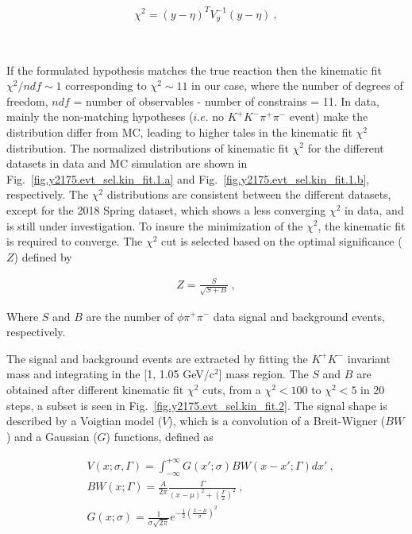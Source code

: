 \begin{equation}
    \label{eq.y2175.evt_sel.kin_fit.1}
    \begin{aligned}
        \chi^{2} = (y-\eta)^{T}V_{y}^{-1}(y-\eta)~,
    \end{aligned}
\end{equation}

~\par If the formulated hypothesis matches the true reaction then the kinematic fit $\chi^{2}/ndf \sim 1$ corresponding to $\chi^{2} \sim 11$ in our case, where the number of degrees of freedom, $ndf$ = number of observables - number of constrains = 11. In data, mainly the non-matching hypotheses ($i.e.$ no $K^{+}K^{-}\pi^{+}\pi^{-}$ event) make the distribution differ from MC, leading to higher tales in the kinematic fit $\chi^{2}$ distribution. The normalized distributions of kinematic fit $\chi^{2}$ for the different datasets in data and MC simulation are shown in Fig.~\ref{fig.y2175.evt_sel.kin_fit.1.a} and Fig.~\ref{fig.y2175.evt_sel.kin_fit.1.b}, respectively. The $\chi^{2}$ distributions are consistent between the different datasets, except for the 2018 Spring dataset, which shows a less converging $\chi^{2}$ in data, and is still under investigation. To insure the minimization of the $\chi^{2}$, the kinematic fit is required to converge. The $\chi^{2}$ cut is selected based on the optimal significance ($Z$) defined by

\begin{equation}
    \label{eq.y2175.evt_sel.kin_fit.2}
    \begin{aligned}
        Z = \frac{S}{\sqrt{S+B}}~,
    \end{aligned}
\end{equation}

Where $S$ and $B$ are the number of $\phi \pi^{+}\pi^{-}$ data signal and background events, respectively.
~\par The signal and background events are extracted by fitting the $K^+K^-$ invariant mass and integrating in the [1, 1.05 GeV/c$^2$] mass region. The $S$ and $B$ are obtained after different kinematic fit $\chi^2$ cuts, from a $\chi^2<100$ to $\chi^2<5$ in 20 steps, a subset is seen in Fig.~\ref{fig.y2175.evt_sel.kin_fit.2}. The signal shape is described by a Voigtian model ($V$), which is a convolution of a Breit-Wigner ($BW$) and a Gaussian ($G$) functions, defined as

\begin{equation}
\label{eq.y2175.evt_sel.kin_fit.3}
    \begin{aligned}
        & V(x;\sigma,\Gamma) = \int_{-\infty}^{+\infty} G(x';\sigma) BW(x-x';\Gamma)dx'~,\\
        & BW(x;\Gamma) =  \frac{A}{2\pi}\frac{\Gamma}{(x-\mu)^2+(\frac{\Gamma}{2})^2}~,\\
        & G(x;\sigma) = \frac{1}{\sigma \sqrt{2\pi}}e^{-\frac{1}{2}(\frac{x-\mu}{\sigma})^2}
    \end{aligned}
\end{equation}

